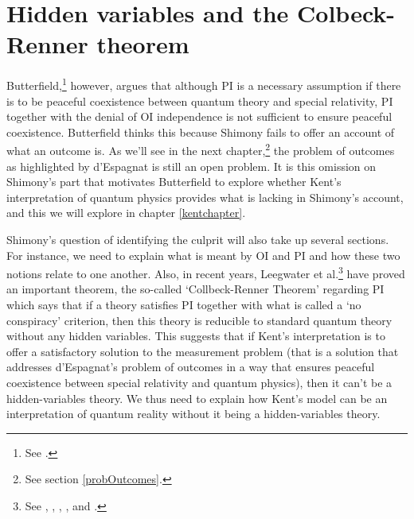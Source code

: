 \section{Hidden variables and the Colbeck-Renner theorem}


Butterfield,\footnote{See \cite{Butterfield}.} however, argues that although PI is a necessary assumption if there is to be peaceful coexistence between quantum theory and special relativity, PI together with the denial of OI independence is not sufficient to ensure peaceful coexistence. Butterfield thinks this because Shimony fails to offer an account of what an outcome is. As we'll see in the next chapter,\footnote{See section \ref{probOutcomes}.} the problem of outcomes as highlighted by d'Espagnat is still an open problem. It is this omission on Shimony's part that motivates Butterfield to explore whether Kent's interpretation of quantum physics provides what is lacking in Shimony's account, and this we will explore in chapter \ref{kentchapter}. 


Shimony's question of identifying the culprit will also take up several sections. For instance, we need to explain what is meant by OI and PI and how these two notions relate to one another. Also, in recent years,  Leegwater et al.\footnote{See \cite{LeegwaterGijs2016Aitf}, \cite{ColbeckRoger2011Neoq}, \cite{ColbeckRoger2012Tcoq}, \cite{LandsmanK2015OtCt}, and \cite{Landsman}.} have  proved an important theorem, the so-called {`Collbeck-Renner Theorem'} regarding PI which says that if a theory satisfies PI together with what is called a {`no conspiracy'} criterion,\label{noconspiracy} then this theory is reducible to standard quantum theory without any hidden variables. This suggests that if Kent's interpretation is to offer a satisfactory solution to the measurement problem (that is a solution that addresses d'Espagnat's problem of outcomes in a way that  ensures peaceful coexistence between special relativity and quantum physics), then it can't be a hidden-variables theory. We thus need to explain how Kent's model can be an interpretation of quantum reality without it being a hidden-variables theory. 



